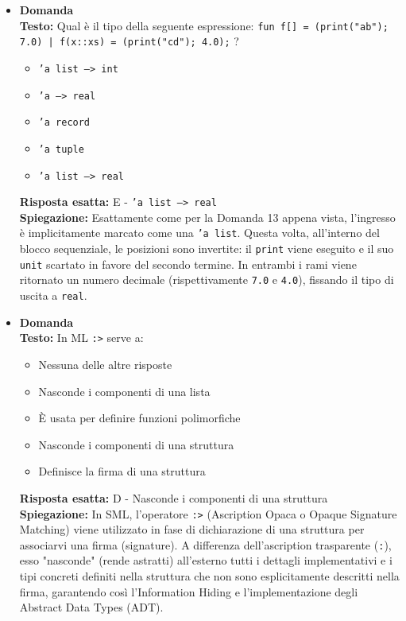 \documentclass[12pt, a4paper]{article}
\newcounter{domandateoria}
\begin{document}
\begin{itemize}
\newpage

    \item {}\textbf{Domanda \thedomandateoria} \\
    \textbf{Testo:} Qual è il tipo della seguente espressione: \texttt{fun f[] = (print("ab"); 7.0) | f(x::xs) = (print("cd"); 4.0);} ?
    \begin{itemize}
        \item[A)] \texttt{'a list --> int}
        \item[B)] \texttt{'a --> real}
        \item[C)] \texttt{'a record}
        \item[D)] \texttt{'a tuple}
        \item[E)] \texttt{'a list --> real}
    \end{itemize}
    \textbf{Risposta esatta:} E - \texttt{'a list --> real} \\
    \textbf{Spiegazione:} Esattamente come per la Domanda 13 appena vista, l'ingresso è implicitamente marcato come una \texttt{'a list}. Questa volta, all'interno del blocco sequenziale, le posizioni sono invertite: il \texttt{print} viene eseguito e il suo \texttt{unit} scartato in favore del secondo termine. In entrambi i rami viene ritornato un numero decimale (rispettivamente \texttt{7.0} e \texttt{4.0}), fissando il tipo di uscita a \texttt{real}.
    \vspace{0.3cm}

    \item {}\textbf{Domanda \thedomandateoria} \\
    \textbf{Testo:} In ML \texttt{:>} serve a:
    \begin{itemize}
        \item[A)] Nessuna delle altre risposte
        \item[B)] Nasconde i componenti di una lista
        \item[C)] È usata per definire funzioni polimorfiche
        \item[D)] Nasconde i componenti di una struttura
        \item[E)] Definisce la firma di una struttura
    \end{itemize}
    \textbf{Risposta esatta:} D - Nasconde i componenti di una struttura \\
    \textbf{Spiegazione:} In SML, l'operatore \texttt{:>} (Ascription Opaca o Opaque Signature Matching) viene utilizzato in fase di dichiarazione di una struttura per associarvi una firma (signature). A differenza dell'ascription trasparente (\texttt{:}), esso "nasconde" (rende astratti) all'esterno tutti i dettagli implementativi e i tipi concreti definiti nella struttura che non sono esplicitamente descritti nella firma, garantendo così l'Information Hiding e l'implementazione degli Abstract Data Types (ADT).
    \vspace{0.3cm}


\end{itemize}
\end{document}
